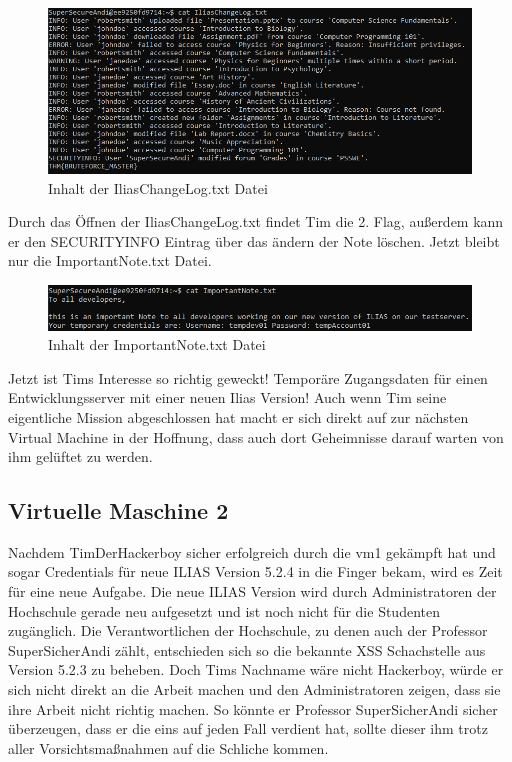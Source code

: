 \documentclass[10pt, a4paper,onecolumn ,titlepage]{article}
\begin{document}
    \begin{figure}[H]
        \centering
        \includegraphics[width=1\textwidth]{VM1_Bilder/IliasChangelog.PNG}
        \caption{Inhalt der IliasChangeLog.txt Datei}
        \label{fig:IliasChangelog}
    \end{figure}

    \noindent
    Durch das Öffnen der IliasChangeLog.txt findet Tim die 2. Flag, außerdem kann er den SECURITYINFO Eintrag über das ändern der Note löschen. Jetzt bleibt nur die
    ImportantNote.txt Datei.

    \begin{figure}[H]
        \centering
        \includegraphics[width=1\textwidth]{VM1_Bilder/ImportantNote.PNG}
        \caption{Inhalt der ImportantNote.txt Datei}
        \label{fig:ImportantNote}
    \end{figure}

    \noindent
    Jetzt ist Tims Interesse so richtig geweckt! Temporäre Zugangsdaten für einen Entwicklungsserver mit einer neuen Ilias Version! Auch wenn Tim
    seine eigentliche Mission abgeschlossen hat macht er sich direkt auf zur nächsten Virtual Machine in der Hoffnung, dass auch dort Geheimnisse
    darauf warten von ihm gelüftet zu werden.


    \subsection{Virtuelle Maschine 2}
    \label{subsec:vm2}
    Nachdem TimDerHackerboy sicher erfolgreich durch die \ac{vm}1 gekämpft hat und sogar Credentials für neue ILIAS Version 5.2.4 in die Finger bekam, wird es Zeit für eine neue Aufgabe.
    Die neue ILIAS Version wird durch Administratoren der Hochschule gerade neu aufgesetzt und ist noch nicht für die Studenten zugänglich.
    Die Verantwortlichen der Hochschule, zu denen auch der Professor SuperSicherAndi zählt, entschieden sich so die bekannte XSS Schachstelle aus Version 5.2.3 zu beheben.
    Doch Tims Nachname wäre nicht Hackerboy, würde er sich nicht direkt an die Arbeit machen und den Administratoren zeigen, dass sie ihre Arbeit nicht richtig machen.
    So könnte er Professor SuperSicherAndi sicher überzeugen, dass er die eins auf jeden Fall verdient hat, sollte dieser ihm trotz aller Vorsichtsmaßnahmen auf die Schliche kommen.
\end{document}
